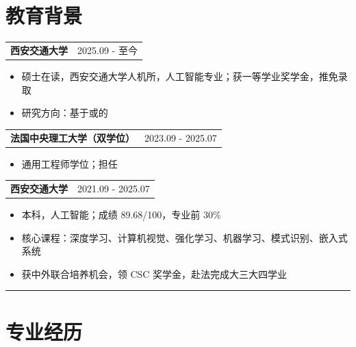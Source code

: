 \documentclass[UTF8]{article}
\begin{document}
\section*{\bfseries\large 教育背景}
\begin{tabularx}{\linewidth}{X r}
    \normalsize \textbf{西安交通大学} & 2025.09 - 至今 \\
\end{tabularx}
\begin{itemize}[leftmargin=1.6em, itemsep=0em, topsep=0.05em, parsep=0pt]
    \item 硕士在读，西安交通大学人机所，人工智能专业；获一等学业奖学金，推免录取
    \item 研究方向：基于或的
\end{itemize}

\begin{tabularx}{\linewidth}{X r}
    \normalsize \textbf{法国中央理工大学（双学位）} & 2023.09 - 2025.07 \\
\end{tabularx}
\begin{itemize}[leftmargin=1.6em, itemsep=0em, topsep=0.05em, parsep=0pt]
    \item 通用工程师学位；担任
\end{itemize}

\begin{tabularx}{\linewidth}{X r}
    \normalsize \textbf{西安交通大学} & 2021.09 - 2025.07 \\
\end{tabularx}
\begin{itemize}[leftmargin=1.6em, itemsep=0em, topsep=0.05em, parsep=0pt]
    \item 本科，人工智能；成绩 89.68/100，专业前 30\%
    \item 核心课程：深度学习、计算机视觉、强化学习、机器学习、模式识别、嵌入式系统
    \item 获中外联合培养机会，领 CSC 奖学金，赴法完成大三大四学业
\end{itemize}

\vspace{0.15em}
\hrule
\vspace{0.2em}

\section*{\bfseries\large 专业经历}
\end{document}
